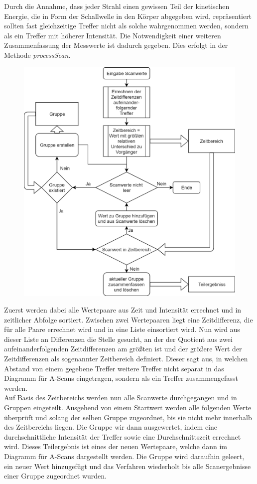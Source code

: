 \documentclass[12pt,a4paper]{scrartcl}
\begin{document}
Durch die Annahme, dass jeder Strahl einen gewissen Teil der kinetischen Energie, die in Form der Schallwelle in den Körper abgegeben wird, repräsentiert sollten fast gleichzeitige Treffer nicht als solche wahrgenommen werden, sondern als ein Treffer mit höherer Intensität. %
Die Notwendigkeit einer weiteren Zusammenfassung der Messwerte ist dadurch gegeben. 
Dies erfolgt in der Methode \textsl{processScan}. %
\begin{figure}
\includegraphics[scale=0.3]{pictures/Flowchart_processScan.png}
\end{figure} \par
Zuerst werden dabei alle Wertepaare aus Zeit und Intensität errechnet und in zeitlicher Abfolge sortiert. 
Zwischen zwei Wertepaaren liegt eine Zeitdifferenz, die für alle Paare errechnet wird und in eine Liste einsortiert wird.
Nun wird aus dieser Liste an Differenzen die Stelle gesucht, an der der Quotient aus zwei aufeinanderfolgenden Zeitdifferenzen am größten ist und der größere Wert der Zeitdifferenzen als sogenannter Zeitbereich definiert. 
Dieser sagt aus, in welchen Abstand von einem gegebene Treffer weitere Treffer nicht separat in das Diagramm für A-Scans eingetragen, sondern als ein Treffer zusammengefasst werden.\\
Auf Basis des Zeitbereichs werden nun alle Scanwerte durchgegangen und in Gruppen eingeteilt. 
Ausgehend von einem Startwert werden alle folgenden Werte überprüft und solang der selben Gruppe zugeordnet, bis sie nicht mehr innerhalb des Zeitbereichs liegen. 
Die Gruppe wir dann ausgewertet, indem eine durchschnittliche Intensität der Treffer sowie eine Durchschnittszeit errechnet wird. 
Dieses Teilergebnis ist eines der neuen Wertepaare, welche dann im Diagramm für A-Scans dargestellt werden. 
Die Gruppe wird daraufhin geleert, ein neuer Wert hinzugefügt und das Verfahren wiederholt bis alle Scanergebnisse einer Gruppe zugeordnet wurden.
\end{document}
